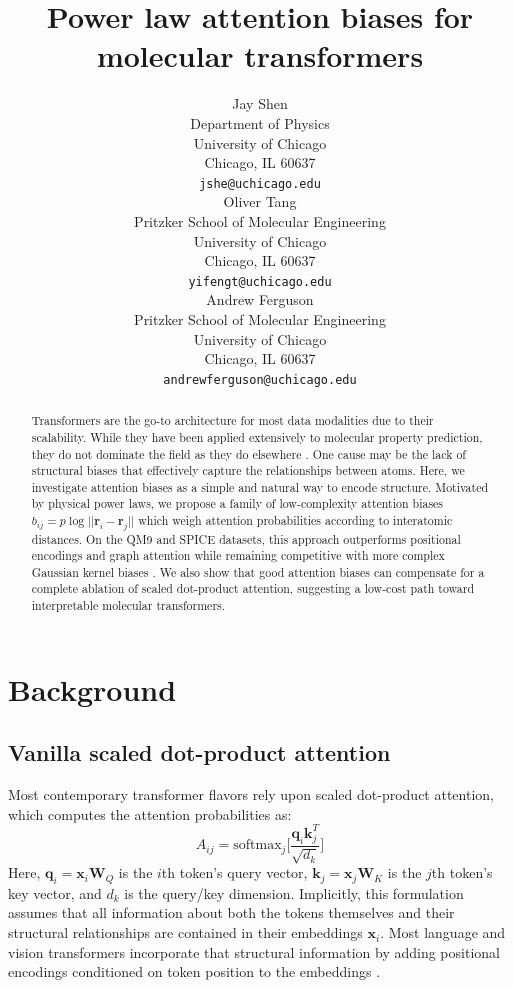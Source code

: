 \documentclass{article}
\title{Power law attention biases for molecular transformers}
\author{
    Jay Shen \\
    Department of Physics \\
    University of Chicago \\
    Chicago, IL 60637 \\
    \texttt{jshe@uchicago.edu} \\
    \And
    Oliver Tang \\
    Pritzker School of Molecular Engineering \\
    University of Chicago \\
    Chicago, IL 60637 \\
    \texttt{yifengt@uchicago.edu} \\
    \And
    Andrew Ferguson \\
    Pritzker School of Molecular Engineering \\
    University of Chicago \\
    Chicago, IL 60637 \\
    \texttt{andrewferguson@uchicago.edu} \\
}
\begin{document}
\maketitle

\begin{abstract}
    Transformers \cite{transformer} are the go-to architecture for most data modalities due to their scalability. While they have been applied extensively to molecular property prediction, they do not dominate the field as they do elsewhere \cite{transformers-mpp, esen}. One cause may be the lack of structural biases that effectively capture the relationships between atoms. Here, we investigate attention biases as a simple and natural way to encode structure. Motivated by physical power laws, we propose a family of low-complexity attention biases $b_{ij} = p \log|| \mathbf{r}_i - \mathbf{r}_j||$ which weigh attention probabilities according to interatomic distances. On the QM9 \cite{qm9} and SPICE \cite{spice} datasets, this approach outperforms positional encodings and graph attention while remaining competitive with more complex Gaussian kernel biases \cite{gaussian-kernel}. We also show that good attention biases can compensate for a complete ablation of scaled dot-product attention, suggesting a low-cost path toward interpretable molecular transformers. 
\end{abstract}

\section{Background}

\subsection{Vanilla scaled dot-product attention}

Most contemporary transformer flavors rely upon scaled dot-product attention, which computes the attention probabilities as: 
\begin{equation}\label{attention}
A_{ij} = \text{softmax}_j \Biggr[ \frac{\mathbf{q}_{i} \mathbf{k}_j^T}{\sqrt{d_k}} \Biggr]
\end{equation}
Here, $\mathbf{q}_{i} = \mathbf{x}_i\mathbf{W}_Q$ is the $i$th token's query vector, $\mathbf{k}_{j} = \mathbf{x}_j\mathbf{W}_K$ is the $j$th token's key vector, and $d_k$ is the query/key dimension. Implicitly, this formulation assumes that all information about both the tokens themselves and their structural relationships are contained in their embeddings $\mathbf{x}_i$. Most language and vision transformers incorporate that structural information by adding positional encodings conditioned on token position to the embeddings \cite{transformer, vit}. 
\end{document}
